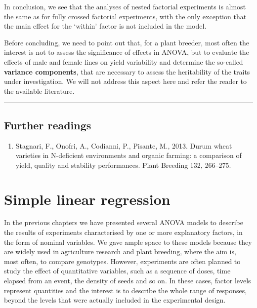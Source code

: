 \documentclass[a4paper,12pt,oneside]{book}
\providecommand{\tightlist}{%
  \setlength{\itemsep}{0pt}\setlength{\parskip}{0pt}}
\begin{document}
In conclusion, we see that the analyses of nested factorial experiments is almost the same as for fully crossed factorial experiments, with the only exception that the main effect for the `within' factor is not included in the model.

Before concluding, we need to point out that, for a plant breeder, most often the interest is not to assess the significance of effects in ANOVA, but to evaluate the effects of male and female lines on yield variability and determine the so-called \textbf{variance components}, that are necessary to assess the heritability of the traits under investigation. We will not address this aspect here and refer the reader to the available literature.

\begin{center}\rule{0.5\linewidth}{0.5pt}\end{center}

\hypertarget{further-readings-8}{%
\section{Further readings}\label{further-readings-8}}

\begin{enumerate}
\def\labelenumi{\arabic{enumi}.}
\tightlist
\item
  Stagnari, F., Onofri, A., Codianni, P., Pisante, M., 2013. Durum wheat varieties in N-deficient environments and organic farming: a comparison of yield, quality and stability performances. Plant Breeding 132, 266--275.
\end{enumerate}

\hypertarget{simple-linear-regression}{%
\chapter{Simple linear regression}\label{simple-linear-regression}}

In the previous chapters we have presented several ANOVA models to describe the results of experiments characterised by one or more explanatory factors, in the form of nominal variables. We gave ample space to these models because they are widely used in agriculture research and plant breeding, where the aim is, most often, to compare genotypes. However, experiments are often planned to study the effect of quantitative variables, such as a sequence of doses, time elapsed from an event, the density of seeds and so on. In these cases, factor levels represent quantities and the interest is to describe the whole range of responses, beyond the levels that were actually included in the experimental design.
\end{document}
